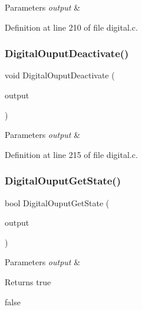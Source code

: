 \begin{DoxyParams}{Parameters}
{\em output} & \\
\hline
\end{DoxyParams}


Definition at line 210 of file digital.\+c.

\mbox{\label{group__hal_gafddace812c99bbfd8455f7a9a2d9e6f9}} 
\subsubsection{\texorpdfstring{Digital\+Ouput\+Deactivate()}{DigitalOuputDeactivate()}}
{\footnotesize\ttfamily void Digital\+Ouput\+Deactivate (\begin{DoxyParamCaption}\item[{\hyperlink{group___plantilla_ga3e63b19d3d0dbfbfb2c50b3ac1f69aa0}{digital\+\_\+output\+\_\+t}}]{output }\end{DoxyParamCaption})}


\begin{DoxyParams}{Parameters}
{\em output} & \\
\hline
\end{DoxyParams}


Definition at line 215 of file digital.\+c.

\mbox{\label{group__hal_gaba02fd1cdd0a19d04cd5d24aa148193e}} 
\subsubsection{\texorpdfstring{Digital\+Ouput\+Get\+State()}{DigitalOuputGetState()}}
{\footnotesize\ttfamily bool Digital\+Ouput\+Get\+State (\begin{DoxyParamCaption}\item[{\hyperlink{group___plantilla_ga3e63b19d3d0dbfbfb2c50b3ac1f69aa0}{digital\+\_\+output\+\_\+t}}]{output }\end{DoxyParamCaption})}


\begin{DoxyParams}{Parameters}
{\em output} & \\
\hline
\end{DoxyParams}
\begin{DoxyReturn}{Returns}
true 

false 
\end{DoxyReturn}


